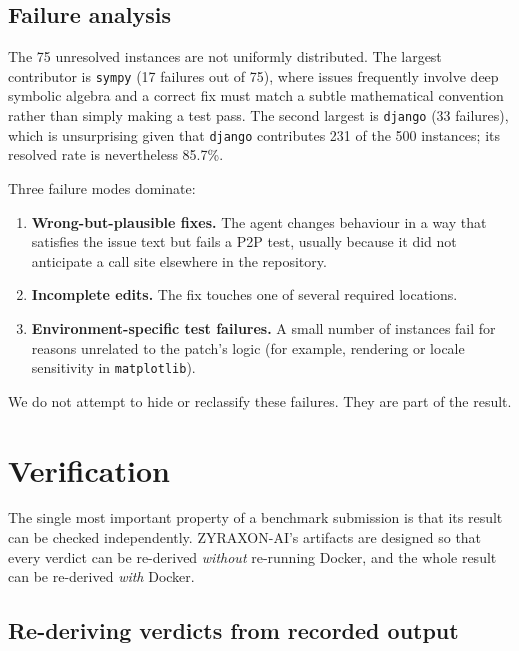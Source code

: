 \documentclass[11pt,a4paper]{article}
\begin{document}
\subsection{Failure analysis}

The 75 unresolved instances are not uniformly distributed. The largest contributor is
\texttt{sympy} (17 failures out of 75), where issues frequently involve deep symbolic
algebra and a correct fix must match a subtle mathematical convention rather than simply
making a test pass. The second largest is \texttt{django} (33 failures), which is
unsurprising given that \texttt{django} contributes 231 of the 500 instances; its
resolved rate is nevertheless 85.7\%.

Three failure modes dominate:

\begin{enumerate}[leftmargin=1.4em]
  \item \textbf{Wrong-but-plausible fixes.} The agent changes behaviour in a way that
  satisfies the issue text but fails a P2P test, usually because it did not anticipate a
  call site elsewhere in the repository.
  \item \textbf{Incomplete edits.} The fix touches one of several required locations.
  \item \textbf{Environment-specific test failures.} A small number of instances fail
  for reasons unrelated to the patch's logic (for example, rendering or locale
  sensitivity in \texttt{matplotlib}).
\end{enumerate}

We do not attempt to hide or reclassify these failures. They are part of the result.

\section{Verification}
\label{sec:verify}

The single most important property of a benchmark submission is that its result can be
checked independently. ZYRAXON-AI's artifacts are designed so that every verdict can be
re-derived \emph{without} re-running Docker, and the whole result can be re-derived
\emph{with} Docker.

\subsection{Re-deriving verdicts from recorded output}
\end{document}
